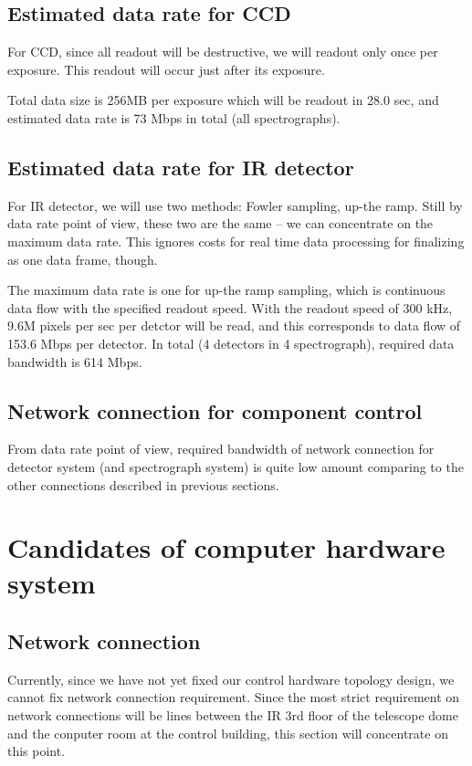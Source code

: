 \documentclass[a4paper,notitlepage]{article}
\begin{document}
\subsection{Estimated data rate for CCD}

For CCD, since all readout will be destructive, we will readout only once 
per exposure. This readout will occur just after its exposure.

Total data size is 256MB per exposure which will be readout in 28.0 sec, 
and estimated data rate is 73 Mbps in total (all spectrographs).


\subsection{Estimated data rate for IR detector}

For IR detector, we will use two methods: Fowler sampling, up-the ramp. 
Still by data rate point of view, these two are the same -- we can concentrate 
on the maximum data rate. This ignores costs for real time data processing for 
finalizing as one data frame, though. 

The maximum data rate is one for up-the ramp sampling, which is continuous 
data flow with the specified readout speed. 
With the readout speed of 300 kHz, 9.6M pixels per sec per detctor will be 
read, and this corresponds to data flow of 153.6 Mbps per detector. 
In total (4 detectors in 4 spectrograph), required data bandwidth is 
614 Mbps.

\subsection{Network connection for component control}

From data rate point of view, required bandwidth of network connection for 
detector system (and spectrograph system) is quite low amount comparing to 
the other connections described in previous sections. 


\section{Candidates of computer hardware system}

\subsection{Network connection}

Currently, since we have not yet fixed our control hardware topology design, 
we cannot fix network connection requirement. 
Since the most strict requirement on network connections will be lines 
between the IR 3rd floor of the telescope dome and the conputer room at the 
control building, this section will concentrate on this point. 
\end{document}

